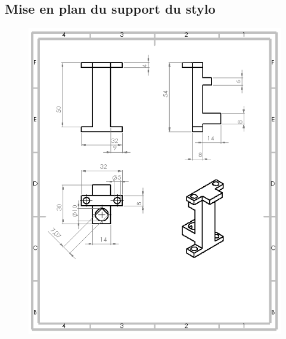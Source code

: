 \begin{changemargin}{-2cm}{-4cm}
\chapter*{Mise en plan du support du stylo}
\begin{figure}[!h]
 \center
 \includegraphics[scale=1]{../3Dmodels/supportstylo.png}
\end{figure}


\end{changemargin}
